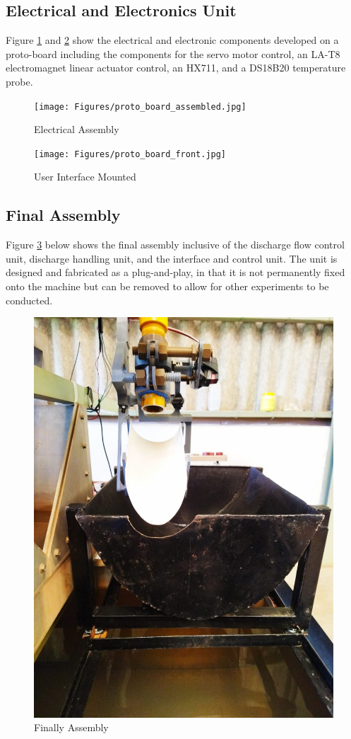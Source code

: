 \subsection{Electrical and Electronics Unit}
Figure \ref{fig: Electrical Assembly} and \ref{fig: User Interface Mounted} show the electrical and electronic components developed on a proto-board including the components for the servo motor control, an LA-T8 electromagnet linear actuator control, an HX711, and a DS18B20 temperature probe. 
\begin{figure}[H]
\centering
\texttt{[image: Figures/proto\_board\_assembled.jpg]}
\caption{Electrical Assembly}
\label{fig: Electrical Assembly}
\end{figure}
        
\begin{figure}[H]
\centering
\texttt{[image: Figures/proto\_board\_front.jpg]}
\caption{User Interface Mounted}
\label{fig: User Interface Mounted}
\end{figure}
\subsection{Final Assembly}
\par 
Figure \ref{fig: Finally Assembly} below shows the final assembly inclusive of the discharge flow control unit, discharge handling unit, and the interface and control unit. The unit is designed and fabricated as a plug-and-play, in that it is not permanently fixed onto the machine but can be removed to allow for other experiments to be conducted.
\begin{figure}[H]
            \centering
            \includegraphics[width=.7\textwidth]{Figures/FinalAssembly.jpeg}
            \caption{Finally Assembly}
            \label{fig: Finally Assembly}
        \end{figure}

